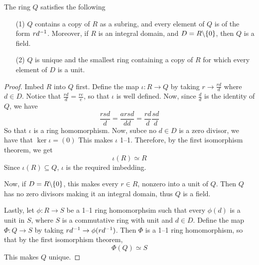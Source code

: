 \begin{corollary}
  The ring $Q$ satisfies the following
  \begin{enumerate}
    \item[(1)] $Q$ contains a copy of $R$ as a subring, and every element of
      $Q$ is of the form $rd^{-1}$. Moreover, if $R$ is an integral
      domain, and $D=R \backslash \{0\}$, then $Q$ is a field.

    \item[(2)] $Q$ is unique and the smallest ring containing a copy of  $R$
      for which every element of  $D$ is a unit.
  \end{enumerate}
\end{corollary}
\begin{proof}
  Imbed $R$ into $Q$ first. Define the map  $\iota:R \xrightarrow{} Q$ by
  taking $r \xrightarrow{} \frac{rd}{d}$ where $d \in D$. Notice that
  $\frac{rd}{d}=\frac{re}{e}$, so that $\iota$ is well defined. Now, since
  $\frac{d}{d}$ is the identity of $Q$, we have
  \begin{equation*}
    \frac{rsd}{d}=\frac{arsd}{dd}=\frac{rd}{d}\frac{sd}{d}
  \end{equation*}
  So that $\iota$ is a ring homomorphism. Now, subce no  $d \in D$ is a zero
  divisor, we have that $\ker{\iota}=(0)$ This makes  $\iota$ 1--1. Therefore,
  by the first isomorphism theorem, we get
  \begin{equation*}
    \iota(R) \simeq R
  \end{equation*}
  Since $\iota(R) \subseteq Q$, $\iota$ is the required imbedding.

  Now, if $D=R \backslash \{0\}$, this makes every $r \in R$, nonzero into a unit
  of  $Q$. Then $Q$ has no zero divisors making it an integral domain, thus
  $Q$ is a field.

  Lastly, let $\phi:R \xrightarrow{} S$ be a 1--1 ring homomorphsim such that
  every $\phi(d)$ is a unit in $S$, where $S$ is a commutative ring with unit
  and $d \in D$. Define the map  $\Phi:Q \xrightarrow{} S$ by taking $rd^{-1}
  \xrightarrow{} \phi(rd^{-1})$. Then $\Phi$ is a 1--1 ring homomorphism, so
  that by the first isomorphism theorem,
  \begin{equation*}
    \Phi(Q) \simeq S
  \end{equation*}
  This makes $Q$ unique.
\end{proof}

